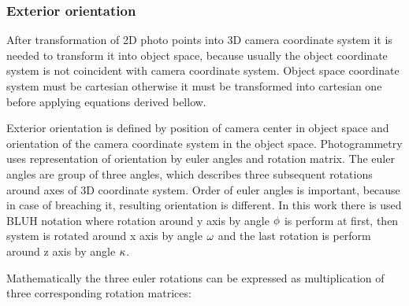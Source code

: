 \documentclass[a4paper,12pt]{article}
\newcommand{\escal}[1]{
{\it #1}
}
\begin{document}
\subsubsection{Exterior orientation}

After transformation of 2D photo points into 3D camera coordinate system it is needed to transform it into object space,
because usually the object coordinate system is not coincident with camera coordinate system. 
Object space coordinate system must be cartesian otherwise it must be transformed into cartesian one before applying equations 
derived bellow. 


Exterior orientation is defined by position of camera center in object space and orientation of the camera coordinate system in the object space.
Photogrammetry uses representation of orientation by euler angles and rotation matrix.
The euler angles are group of three angles, which describes three subsequent rotations
 around axes of 3D coordinate system. 
 Order of euler angles is important, because in case of breaching it, resulting orientation is different. 
 In this work there is used BLUH notation \cite{baumker2001new} where rotation around y axis by angle $\escal{\phi}$ is 
 perform at first, then system is rotated around x axis  by angle $\escal{\omega}$ and
 the last rotation is perform around z axis by angle $\escal{\kappa}$.
 
Mathematically the three euler rotations can be expressed as multiplication of three corresponding
rotation matrices:

\end{document}
